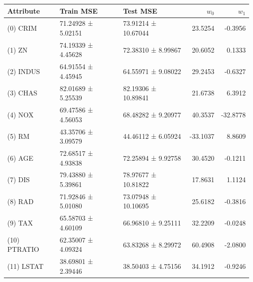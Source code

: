\begin{tabular}{lllrr}
\toprule
Attribute & Train MSE & Test MSE & $w_{0}$ & $w_{1}$ \\
\midrule
(0) CRIM & 71.24928 ± 5.02151 & 73.91214 ± 10.67044 & 23.5254 & -0.3956 \\
(1)  ZN  & 74.19339 ± 4.45628 & 72.38310 ± 8.99867 & 20.6052 & 0.1333 \\
(2) INDUS  & 64.91554 ± 4.45945 & 64.55971 ± 9.08022 & 29.2453 & -0.6327 \\
(3) CHAS & 82.01689 ± 5.25539 & 82.19306 ± 10.89841 & 21.6738 & 6.3912 \\
(4) NOX & 69.47586 ± 4.56053 & 68.48282 ± 9.20977 & 40.3537 & -32.8778 \\
(5) RM & 43.35706 ± 3.09579 & 44.46112 ± 6.05924 & -33.1037 & 8.8609 \\
(6) AGE & 72.68517 ± 4.93838 & 72.25894 ± 9.92758 & 30.4520 & -0.1211 \\
(7) DIS & 79.43880 ± 5.39861 & 78.97677 ± 10.81822 & 17.8631 & 1.1124 \\
(8) RAD & 71.92846 ± 5.01080 & 73.07948 ± 10.10695 & 25.6182 & -0.3816 \\
(9) TAX & 65.58703 ± 4.60109 & 66.96810 ± 9.25111 & 32.2209 & -0.0248 \\
(10) PTRATIO & 62.35007 ± 4.09324 & 63.83268 ± 8.29972 & 60.4908 & -2.0800 \\
(11) LSTAT & 38.69801 ± 2.39446 & 38.50403 ± 4.75156 & 34.1912 & -0.9246 \\
\bottomrule
\end{tabular}
